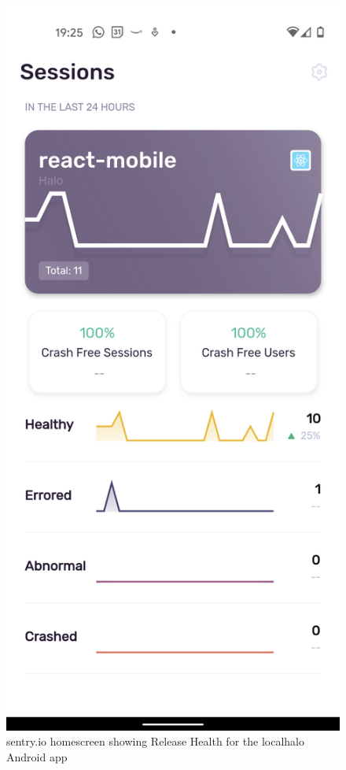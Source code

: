 \begin{figure}
    \centering
    \includegraphics{images/sentry.io/Screenshot_20210914-192538.png}
    \caption{sentry.io homescreen showing Release Health for the localhalo Android app}
    \label{fig:sentry-io-homescreen-release-health-for-localhalo-android}
\end{figure}


